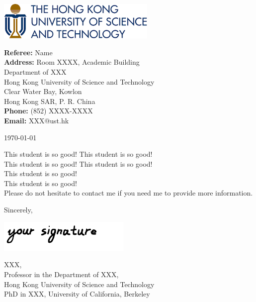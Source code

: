 \documentclass[12pt, a4paper]{letter} %
\begin{document}
\begin{minipage}{0.5\textwidth}
\includegraphics[width=3in]{hkust_logo}\\
\end{minipage}
\hfill
\begin{minipage}{0.6\textwidth}\raggedright
\small{\textbf{\color{ustblue}Referee: }Name\\
\textbf{\color{ustblue}Address: }Room XXXX, Academic Building\\
\hphantom{AA}Department of XXX\\
\hphantom{AA}Hong Kong University of Science and Technology\\
\hphantom{AA}Clear Water Bay, Kowlon\\
\hphantom{AA}Hong Kong SAR, P. R. China\\
\textbf{\color{ustblue}Phone: }(852) XXXX-XXXX\\
\textbf{\color{ustblue}Email: }XXX@ust.hk }
\end{minipage}

\today

This student is so good! This student is so good!\\

This student is so good! This student is so good!\\

This student is so good!\\
This student is so good!\\

Please do not hesitate to contact me if you need me to provide more information.

Sincerely,

\includegraphics[width=2.5in]{signature}

XXX,\\
Professor in the Department of XXX,\\
Hong Kong University of Science and Technology\\
PhD in XXX, University of California, Berkeley
\end{document}
